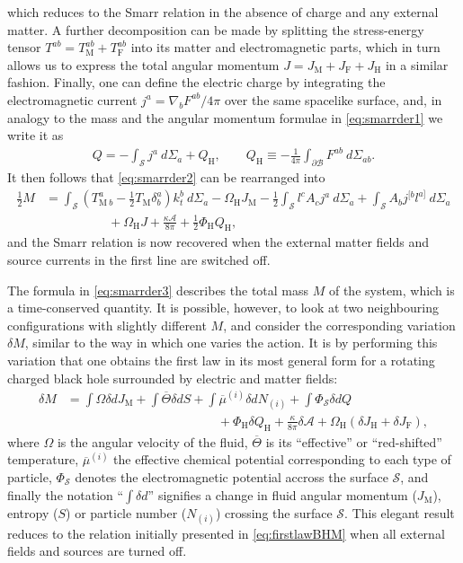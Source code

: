 \documentclass[
twoside,
openright,
frontopenright
]{dmathesis}
\newcommand{\nn}{\nonumber}
\begin{document}
which reduces to the Smarr relation in the absence of charge and any external
matter. A further decomposition can be made by splitting the stress-energy
tensor $T^{ab} = T_\mathrm{M}^{ab} + T_\mathrm{F}^{ab}$ into its matter and
electromagnetic parts, which in turn allows us to express the total angular
momentum $J = J_\mathrm{M} + J_\mathrm{F} + J_\mathrm{H}$ in a similar
fashion. Finally, one can define the electric charge by integrating the
electromagnetic current $j^a = \nabla_b F^{ab}/4\pi$ over the same spacelike
surface, and, in analogy to the mass and the angular momentum formulae in
\cref{eq:smarrder1} we write it as
\begin{align}
  Q = -\int_\mathcal{S} j^a ~d\Sigma_a + Q_\mathrm{H}, \qquad Q_\mathrm{H} \equiv -\frac{1}{4\pi}\int_{\partial\mathcal{B}}F^{ab} ~ d\Sigma_{ab}.
\end{align}
It then follows that \cref{eq:smarrder2} can be rearranged into
\begin{align}
  \label{eq:smarrder3}
  \frac12 M &= \int_\mathcal{S} \left(T^a_{\mathrm{M}~b} - \frac12 T_\mathrm{M}
  \delta^a_b\right)k_t^b~d\Sigma_a - \Omega_\mathrm{H} J_\mathrm{M} - \frac12
\int_\mathcal{S} l^c A_c j^a~d\Sigma_a + \int_\mathcal{S} A_b j^{[b}l^{a]}~d\Sigma_a \nn\\
&\hspace{5em}+ \Omega_\mathrm{H} J + \frac{\kappa \mathcal{A}}{8\pi} + \frac12
\Phi_\mathrm{H} Q_\mathrm{H},
\end{align}
and the Smarr relation is now recovered when the external matter fields and
source currents in the first line are switched off.

The formula in \cref{eq:smarrder3} describes the total mass $M$ of the system,
which is a time-conserved quantity. It is possible, however, to look at two
neighbouring configurations with slightly different $M$, and consider the
corresponding variation $\delta M$, similar to the way in which one varies the
action. It is by performing this variation that one obtains the first law in its
most general form for a rotating charged black hole surrounded by electric and
matter fields:
\begin{align}
  \label{eq:firstlawder1}
  \delta M &= \int \Omega\delta dJ_\mathrm{M} + \int \overline{\Theta}\delta dS +
  \int \overline{\mu}^{(i)} \delta dN_{(i)} +\int \Phi_\mathcal{S}\delta dQ \nn\\
  &\hspace{12em}+ \Phi_\mathrm{H} \delta
  Q_\mathrm{H} + \frac{\kappa}{8\pi}\delta\mathcal{A} + \Omega_\mathrm{H}(\delta
  J_\mathrm{H}+\delta J_\mathrm{F}),
\end{align}
where $\Omega$ is the angular velocity of the fluid, $\overline{\Theta}$ is its
``effective'' or ``red-shifted'' temperature, $\overline{\mu}^{(i)}$ the
effective chemical potential corresponding to each type of particle,
$\Phi_\mathcal{S}$ denotes the electromagnetic potential accross the surface
$\mathcal{S}$, and finally the notation ``$\int\delta d$'' signifies a change in
fluid angular momentum ($J_\mathrm{M}$), entropy ($S$) or particle number
($N_{(i)}$) crossing the surface $\mathcal{S}$. This elegant result reduces to
the relation initially presented in \cref{eq:firstlawBHM} when all external
fields and sources are turned off.
\end{document}
